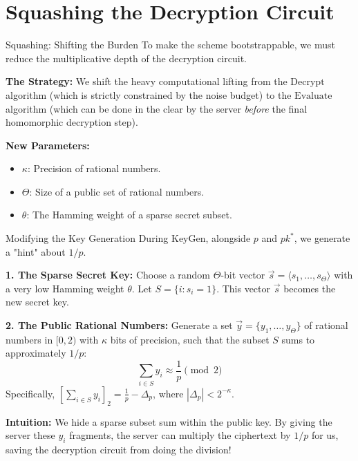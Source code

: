 \documentclass[10pt, aspectratio=169]{beamer}
\begin{document}
\section{Squashing the Decryption Circuit}
\begin{frame}{Squashing: Shifting the Burden}
    To make the scheme bootstrappable, we must reduce the multiplicative depth of the decryption circuit.
    \pause
    
    \vspace{0.3cm}
    \textbf{The Strategy:}
    We shift the heavy computational lifting from the $\text{Decrypt}$ algorithm (which is strictly constrained by the noise budget) to the $\text{Evaluate}$ algorithm (which can be done in the clear by the server \textit{before} the final homomorphic decryption step).
    \pause
    
    \vspace{0.3cm}
    \textbf{New Parameters:}
    \begin{itemize}
        \item $\kappa$: Precision of rational numbers.
        \item $\Theta$: Size of a public set of rational numbers.
        \item $\theta$: The Hamming weight of a sparse secret subset.
    \end{itemize}
\end{frame}

\begin{frame}{Modifying the Key Generation}
    During KeyGen, alongside $p$ and $pk^*$, we generate a "hint" about $1/p$.
    \pause

    \vspace{0.2cm}
    \textbf{1. The Sparse Secret Key:}
    Choose a random $\Theta$-bit vector $\vec{s} = \langle s_1, \dots, s_\Theta \rangle$ with a very low Hamming weight $\theta$. 
    Let $S = \{i : s_i = 1\}$. This vector $\vec{s}$ becomes the new secret key.
    \pause

    \vspace{0.2cm}
    \textbf{2. The Public Rational Numbers:}
    Generate a set $\vec{y} = \{y_1, \dots, y_\Theta\}$ of rational numbers in $[0, 2)$ with $\kappa$ bits of precision, such that the subset $S$ sums to approximately $1/p$:
    $$\sum_{i \in S} y_i \approx \frac{1}{p} \pmod 2$$
    Specifically, $\left[ \sum_{i \in S} y_i \right]_2 = \frac{1}{p} - \Delta_p$, where $|\Delta_p| < 2^{-\kappa}$.
    \pause

    \vspace{0.2cm}
    \textbf{Intuition:} We hide a sparse subset sum within the public key. By giving the server these $y_i$ fragments, the server can multiply the ciphertext by $1/p$ for us, saving the decryption circuit from doing the division!
\end{frame}
\end{document}
